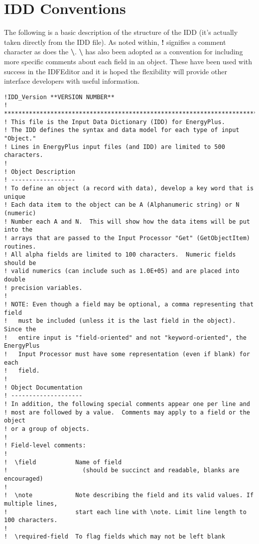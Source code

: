 \section{IDD Conventions}\label{idd-conventions}

The following is a basic description of the structure of the IDD (it's actually taken directly from the IDD file). As noted within, \textbf{!} signifies a comment character as does the \textbf{\textbackslash{}}. \textbf{\textbackslash{}} has also been adopted as a convention for including more specific comments about each field in an object. These have been used with success in the IDFEditor and it is hoped the flexibility will provide other interface developers with useful information.

\begin{lstlisting}
!IDD_Version **VERSION NUMBER**
! **************************************************************************
! This file is the Input Data Dictionary (IDD) for EnergyPlus.
! The IDD defines the syntax and data model for each type of input "Object."
! Lines in EnergyPlus input files (and IDD) are limited to 500 characters.
!
! Object Description
! ------------------
! To define an object (a record with data), develop a key word that is unique
! Each data item to the object can be A (Alphanumeric string) or N (numeric)
! Number each A and N.  This will show how the data items will be put into the
! arrays that are passed to the Input Processor "Get" (GetObjectItem) routines.
! All alpha fields are limited to 100 characters.  Numeric fields should be
! valid numerics (can include such as 1.0E+05) and are placed into double
! precision variables.
!
! NOTE: Even though a field may be optional, a comma representing that field
!   must be included (unless it is the last field in the object).  Since the
!   entire input is "field-oriented" and not "keyword-oriented", the EnergyPlus
!   Input Processor must have some representation (even if blank) for each
!   field.
!
! Object Documentation
! --------------------
! In addition, the following special comments appear one per line and
! most are followed by a value.  Comments may apply to a field or the object
! or a group of objects.
!
! Field-level comments:
!
!  \field           Name of field
!                     (should be succinct and readable, blanks are encouraged)
!
!  \note            Note describing the field and its valid values. If multiple lines,
!                   start each line with \note. Limit line length to 100 characters.
!
!  \required-field  To flag fields which may not be left blank

\end{lstlisting}
